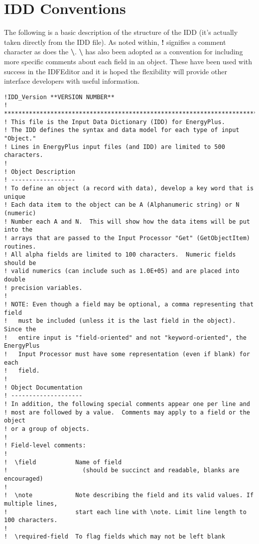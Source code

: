 \section{IDD Conventions}\label{idd-conventions}

The following is a basic description of the structure of the IDD (it's actually taken directly from the IDD file). As noted within, \textbf{!} signifies a comment character as does the \textbf{\textbackslash{}}. \textbf{\textbackslash{}} has also been adopted as a convention for including more specific comments about each field in an object. These have been used with success in the IDFEditor and it is hoped the flexibility will provide other interface developers with useful information.

\begin{lstlisting}
!IDD_Version **VERSION NUMBER**
! **************************************************************************
! This file is the Input Data Dictionary (IDD) for EnergyPlus.
! The IDD defines the syntax and data model for each type of input "Object."
! Lines in EnergyPlus input files (and IDD) are limited to 500 characters.
!
! Object Description
! ------------------
! To define an object (a record with data), develop a key word that is unique
! Each data item to the object can be A (Alphanumeric string) or N (numeric)
! Number each A and N.  This will show how the data items will be put into the
! arrays that are passed to the Input Processor "Get" (GetObjectItem) routines.
! All alpha fields are limited to 100 characters.  Numeric fields should be
! valid numerics (can include such as 1.0E+05) and are placed into double
! precision variables.
!
! NOTE: Even though a field may be optional, a comma representing that field
!   must be included (unless it is the last field in the object).  Since the
!   entire input is "field-oriented" and not "keyword-oriented", the EnergyPlus
!   Input Processor must have some representation (even if blank) for each
!   field.
!
! Object Documentation
! --------------------
! In addition, the following special comments appear one per line and
! most are followed by a value.  Comments may apply to a field or the object
! or a group of objects.
!
! Field-level comments:
!
!  \field           Name of field
!                     (should be succinct and readable, blanks are encouraged)
!
!  \note            Note describing the field and its valid values. If multiple lines,
!                   start each line with \note. Limit line length to 100 characters.
!
!  \required-field  To flag fields which may not be left blank

\end{lstlisting}
